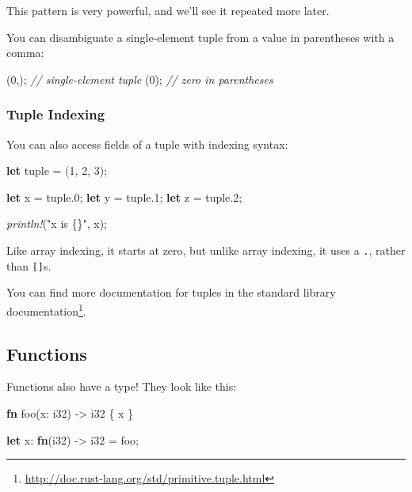 \documentclass[a4paper,]{book}
\newenvironment{Shaded}{\begin{snugshade}}{\end{snugshade}}
\newcommand{\KeywordTok}[1]{\textcolor[rgb]{0.13,0.29,0.53}{\textbf{{#1}}}}
\newcommand{\DataTypeTok}[1]{\textcolor[rgb]{0.13,0.29,0.53}{{#1}}}
\newcommand{\DecValTok}[1]{\textcolor[rgb]{0.00,0.00,0.81}{{#1}}}
\newcommand{\StringTok}[1]{\textcolor[rgb]{0.31,0.60,0.02}{{#1}}}
\newcommand{\CommentTok}[1]{\textcolor[rgb]{0.56,0.35,0.01}{\textit{{#1}}}}
\newcommand{\PreprocessorTok}[1]{\textcolor[rgb]{0.56,0.35,0.01}{\textit{{#1}}}}
\newcommand{\NormalTok}[1]{{#1}}
\renewcommand{\href}[2]{#2\footnote{\url{#1}}}
\begin{document}
This pattern is very powerful, and we'll see it repeated more later.

You can disambiguate a single-element tuple from a value in parentheses
with a comma:

\begin{Shaded}
\begin{Highlighting}[]
\NormalTok{(}\DecValTok{0}\NormalTok{,); }\CommentTok{// single-element tuple}
\NormalTok{(}\DecValTok{0}\NormalTok{); }\CommentTok{// zero in parentheses}
\end{Highlighting}
\end{Shaded}

\subsubsection{Tuple Indexing}\label{tuple-indexing}

You can also access fields of a tuple with indexing syntax:

\begin{Shaded}
\begin{Highlighting}[]
\KeywordTok{let} \NormalTok{tuple = (}\DecValTok{1}\NormalTok{, }\DecValTok{2}\NormalTok{, }\DecValTok{3}\NormalTok{);}

\KeywordTok{let} \NormalTok{x = tuple.}\DecValTok{0}\NormalTok{;}
\KeywordTok{let} \NormalTok{y = tuple.}\DecValTok{1}\NormalTok{;}
\KeywordTok{let} \NormalTok{z = tuple.}\DecValTok{2}\NormalTok{;}

\PreprocessorTok{println!}\NormalTok{(}\StringTok{"x is \{\}"}\NormalTok{, x);}
\end{Highlighting}
\end{Shaded}

Like array indexing, it starts at zero, but unlike array indexing, it
uses a \texttt{.}, rather than \texttt{{[}{]}}s.

You can find more documentation for tuples
\href{http://doc.rust-lang.org/std/primitive.tuple.html}{in the standard
library documentation}.

\hypertarget{functions}{\subsection{Functions}\label{functions}}

Functions also have a type! They look like this:

\begin{Shaded}
\begin{Highlighting}[]
\KeywordTok{fn} \NormalTok{foo(x: }\DataTypeTok{i32}\NormalTok{) -> }\DataTypeTok{i32} \NormalTok{\{ x \}}

\KeywordTok{let} \NormalTok{x: }\KeywordTok{fn}\NormalTok{(}\DataTypeTok{i32}\NormalTok{) -> }\DataTypeTok{i32} \NormalTok{= foo;}
\end{Highlighting}
\end{Shaded}
\end{document}
